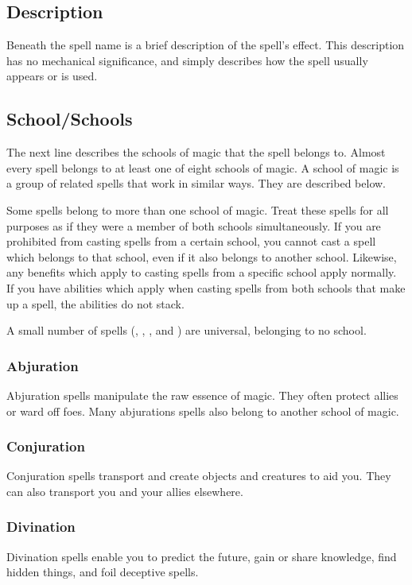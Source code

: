 \subsection{Description}
Beneath the spell name is a brief description of the spell's effect. This description has no mechanical significance, and simply describes how the spell usually appears or is used.

\subsection{School/Schools}
The next line describes the schools of magic that the spell belongs to. Almost every spell belongs to at least one of eight schools of magic. A school of magic is a group of related spells that work in similar ways. They are described below.

Some spells belong to more than one school of magic. Treat these spells for all purposes as if they were a member of both schools simultaneously. If you are prohibited from casting spells from a certain school, you cannot cast a spell which belongs to that school, even if it also belongs to another school. Likewise, any benefits which apply to casting spells from a specific school apply normally. If you have abilities which apply when casting spells from both schools that make up a spell, the abilities do not stack.

A small number of spells (, , , and ) are universal, belonging to no school.

\subsubsection{Abjuration}
Abjuration spells manipulate the raw essence of magic. They often protect allies or ward off foes. Many abjurations spells also belong to another school of magic.

\subsubsection{Conjuration}
Conjuration spells transport and create objects and creatures to aid you. They can also transport you and your allies elsewhere.

\subsubsection{Divination}
Divination spells enable you to predict the future, gain or share knowledge, find hidden things, and foil deceptive spells.

